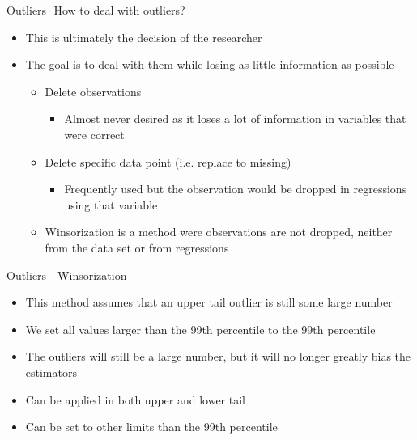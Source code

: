 \documentclass[aspectratio=169]{beamer}
\begin{document}
\begin{frame}{Outliers \newline How to deal with outliers?}
	\begin{itemize}
		\item This is ultimately the decision of the researcher
		\item The goal is to deal with them while losing as little information as possible
		\begin{itemize}
			\item Delete observations
			\begin{itemize}
				\item Almost never desired as it loses a lot of information in variables that were correct
			\end{itemize}
			\item Delete specific data point (i.e. replace to missing)
			\begin{itemize}
				\item Frequently used but the observation would be dropped in regressions using that variable
			\end{itemize}
			\item Winsorization is a method were observations are not dropped, neither from the data set or from regressions
		\end{itemize}
	\end{itemize}
\end{frame}

\begin{frame}{Outliers - Winsorization}
	\begin{itemize}
		\item This method assumes that an upper tail outlier is still some large number
		\item We set all values larger than the 99th percentile to the 99th percentile
		\item The outliers will still be a large number, but it will no longer greatly bias the estimators
		\item Can be applied in both upper and lower tail
		\item Can be set to other limits than the 99th percentile
	\end{itemize}
\end{frame}
\end{document}
